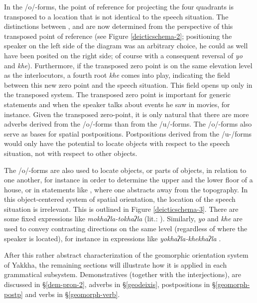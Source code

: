 In the /o/-forms, the point of reference for  projecting the four quadrants is transposed to a location that is not identical to the speech situation. The distinctions between ,  and  are now determined from the perspective of this transposed point of reference (see Figure \ref{deicticschema-2}; positioning  the speaker on the left side of the diagram was an arbitrary choice, he could as well have been posited on the right side; of course with a consequent reversal of \emph{yo} and \emph{khe}). Furthermore, if the transposed zero point is on the same elevation level as the interlocutors, a fourth root \emph{khe} comes into play, indicating the field between this new zero point and the speech situation. This field opens up only in the transposed system. The transposed zero point is important for generic statements and when the speaker talks about events he saw in movies, for instance. Given the transposed zero-point, it is only natural that there are more adverbs derived from the /o/-forms than from the /u/-forms. The  /o/-forms also serve as bases for spatial postpositions. Postpositions derived from the /u-/forms would only have the potential to locate objects with respect to the speech situation, not with respect to other objects.

The /o/-forms are also used to locate objects, or parts of objects, in relation to one another, for instance in order to determine the upper and the lower floor of a house, or in statements like , where one abstracts away from the topography. In this object-centered system of spatial orientation, the location of the speech situation is irrelevant.  This is outlined in Figure \ref{deicticschema-3}.  There are some fixed expressions like \emph{mokhaʔla-tokhaʔla}  (lit.: ). Similarly, \emph{yo} and \emph{khe} are used to convey contrasting directions on the same level (regardless of where the speaker is located), for instance in expressions like \emph{yokhaʔla-khekhaʔla} .

After this rather abstract characterization of the geomorphic orientation system of Yakkha, the remaining sections will illustrate how it is applied in each grammatical subsystem. Demonstratives (together with the interjections), are discussed in §\ref{dem-pron-2}, adverbs in  §\ref{geodeixis}, postpositions  in §\ref{geomorph-postp} and verbs in §\ref{geomorph-verb}.



